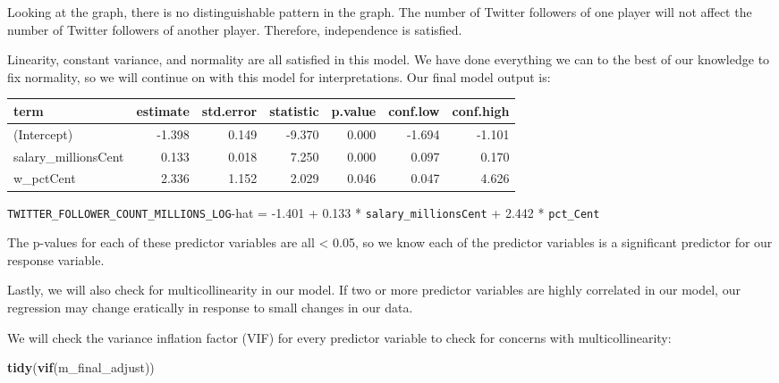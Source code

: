 \documentclass[]{article}
\newenvironment{Shaded}{\begin{snugshade}}{\end{snugshade}}
\newcommand{\DataTypeTok}[1]{\textcolor[rgb]{0.13,0.29,0.53}{#1}}
\newcommand{\DecValTok}[1]{\textcolor[rgb]{0.00,0.00,0.81}{#1}}
\newcommand{\KeywordTok}[1]{\textcolor[rgb]{0.13,0.29,0.53}{\textbf{#1}}}
\newcommand{\NormalTok}[1]{#1}
\newcommand{\OperatorTok}[1]{\textcolor[rgb]{0.81,0.36,0.00}{\textbf{#1}}}
\newcommand{\OtherTok}[1]{\textcolor[rgb]{0.56,0.35,0.01}{#1}}
\newcommand{\StringTok}[1]{\textcolor[rgb]{0.31,0.60,0.02}{#1}}
\begin{document}
Looking at the graph, there is no distinguishable pattern in the graph.
The number of Twitter followers of one player will not affect the number
of Twitter followers of another player. Therefore, independence is
satisfied.

Linearity, constant variance, and normality are all satisfied in this
model. We have done everything we can to the best of our knowledge to
fix normality, so we will continue on with this model for
interpretations. Our final model output is:

\begin{Shaded}
\end{Shaded}

\begin{longtable}[]{@{}lrrrrrr@{}}
\toprule
term & estimate & std.error & statistic & p.value & conf.low &
conf.high\tabularnewline
\midrule
\endhead
(Intercept) & -1.398 & 0.149 & -9.370 & 0.000 & -1.694 &
-1.101\tabularnewline
salary\_millionsCent & 0.133 & 0.018 & 7.250 & 0.000 & 0.097 &
0.170\tabularnewline
w\_pctCent & 2.336 & 1.152 & 2.029 & 0.046 & 0.047 &
4.626\tabularnewline
\bottomrule
\end{longtable}

\texttt{TWITTER\_FOLLOWER\_COUNT\_MILLIONS\_LOG}-hat = -1.401 + 0.133 *
\texttt{salary\_millionsCent} + 2.442 * \texttt{pct\_Cent}

The p-values for each of these predictor variables are all \textless{}
0.05, so we know each of the predictor variables is a significant
predictor for our response variable.

Lastly, we will also check for multicollinearity in our model. If two or
more predictor variables are highly correlated in our model, our
regression may change eratically in response to small changes in our
data.

We will check the variance inflation factor (VIF) for every predictor
variable to check for concerns with multicollinearity:

\begin{Shaded}
\begin{Highlighting}[]
\KeywordTok{tidy}\NormalTok{(}\KeywordTok{vif}\NormalTok{(m_final_adjust))}
\end{Highlighting}
\end{Shaded}
\end{document}
